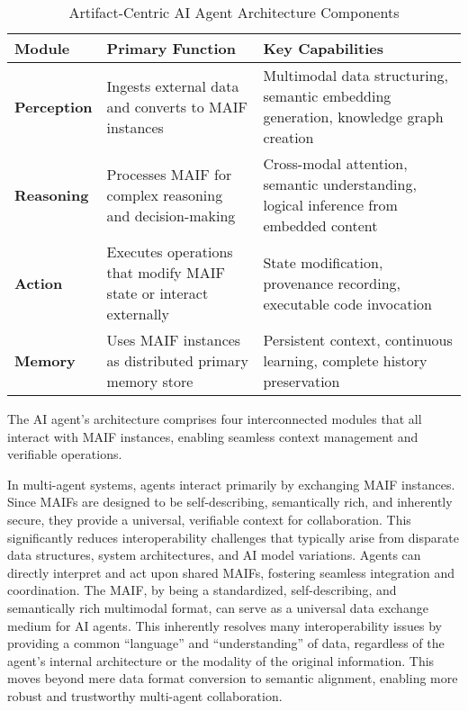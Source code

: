 \documentclass[conference]{IEEEtran}
\begin{document}
\begin{table*}[!t]
\renewcommand{\arraystretch}{1.3}
\caption{Artifact-Centric AI Agent Architecture Components}
\label{tab:agent-components}
\centering
\footnotesize
\begin{tabular}{p{3cm}p{5.5cm}p{5.5cm}}
\toprule
\textbf{Module} & \textbf{Primary Function} & \textbf{Key Capabilities} \\
\midrule
\textbf{Perception} & Ingests external data and converts to MAIF instances & Multimodal data structuring, semantic embedding generation, knowledge graph creation \\
\textbf{Reasoning} & Processes MAIF for complex reasoning and decision-making & Cross-modal attention, semantic understanding, logical inference from embedded content \\
\textbf{Action} & Executes operations that modify MAIF state or interact externally & State modification, provenance recording, executable code invocation \\
\textbf{Memory} & Uses MAIF instances as distributed primary memory store & Persistent context, continuous learning, complete history preservation \\
\bottomrule
\end{tabular}
\end{table*}

The AI agent's architecture comprises four interconnected modules that all interact with MAIF instances, enabling seamless context management and verifiable operations.

In multi-agent systems, agents interact primarily by exchanging MAIF instances. Since MAIFs are designed to be self-describing, semantically rich, and inherently secure, they provide a universal, verifiable context for collaboration. This significantly reduces interoperability challenges that typically arise from disparate data structures, system architectures, and AI model variations\cite{ref29}. Agents can directly interpret and act upon shared MAIFs, fostering seamless integration and coordination. The MAIF, by being a standardized, self-describing, and semantically rich multimodal format, can serve as a universal data exchange medium for AI agents. This inherently resolves many interoperability issues by providing a common ``language'' and ``understanding'' of data, regardless of the agent's internal architecture or the modality of the original information. This moves beyond mere data format conversion to semantic alignment, enabling more robust and trustworthy multi-agent collaboration.
\end{document}
